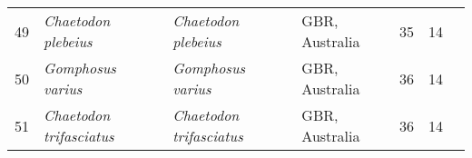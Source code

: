 \begin{table}[ht]
\begin{center}
{\begin{tabular}{rlllrrl}
   49 & \textit{Chaetodon plebeius} & \textit{Chaetodon plebeius} & GBR, Australia &  35 &  14 & \citep{sweatman2008} \\ 
   50 & \textit{Gomphosus varius} & \textit{Gomphosus varius} & GBR, Australia &  36 &  14 & \citep{sweatman2008} \\ 
   51 & \textit{Chaetodon trifasciatus} & \textit{Chaetodon trifasciatus} & GBR, Australia &  36 &  14 & \citep{sweatman2008} \\ 
   \bottomrule
\end{tabular}
}
\end{center}
\end{table}
